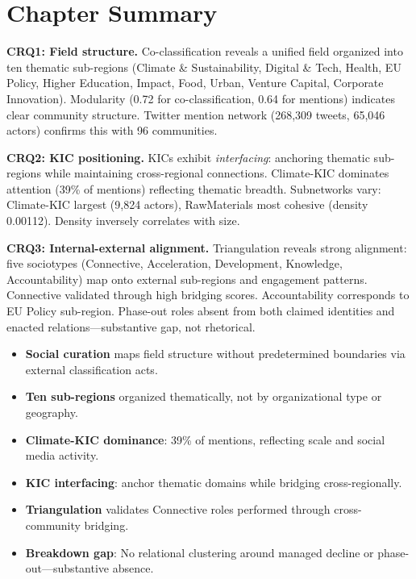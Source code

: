 \documentclass[../main.tex]{subfiles}
\begin{document}
\section{Chapter Summary}

\textbf{CRQ1: Field structure.} Co-classification reveals a unified field organized into ten thematic sub-regions (Climate \& Sustainability, Digital \& Tech, Health, EU Policy, Higher Education, Impact, Food, Urban, Venture Capital, Corporate Innovation). Modularity (0.72 for co-classification, 0.64 for mentions) indicates clear community structure. Twitter mention network (268,309 tweets, 65,046 actors) confirms this with 96 communities.

\textbf{CRQ2: KIC positioning.} KICs exhibit \textit{interfacing}: anchoring thematic sub-regions while maintaining cross-regional connections. Climate-KIC dominates attention (39\% of mentions) reflecting thematic breadth. Subnetworks vary: Climate-KIC largest (9,824 actors), RawMaterials most cohesive (density 0.00112). Density inversely correlates with size.

\textbf{CRQ3: Internal-external alignment.} Triangulation reveals strong alignment: five sociotypes (Connective, Acceleration, Development, Knowledge, Accountability) map onto external sub-regions and engagement patterns. Connective validated through high bridging scores. Accountability corresponds to EU Policy sub-region. Phase-out roles absent from both claimed identities and enacted relations---substantive gap, not rhetorical.

\begin{summarybox}
\begin{itemize}[leftmargin=*, itemsep=0.3em]
\item \textbf{Social curation} maps field structure without predetermined boundaries via external classification acts.
\item \textbf{Ten sub-regions} organized thematically, not by organizational type or geography.
\item \textbf{Climate-KIC dominance}: 39\% of mentions, reflecting scale and social media activity.
\item \textbf{KIC interfacing}: anchor thematic domains while bridging cross-regionally.
\item \textbf{Triangulation} validates Connective roles performed through cross-community bridging.
\item \textbf{Breakdown gap}: No relational clustering around managed decline or phase-out---substantive absence.
\end{itemize}
\end{summarybox}
\end{document}
